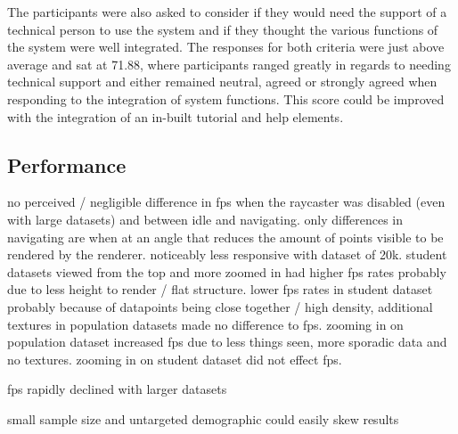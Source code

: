 {{		The participants were also asked to consider if they would need the support of a technical person to use the system and if they thought the various functions of the system were well integrated. The responses for both criteria were just above average and sat at 71.88, where participants ranged greatly in regards to needing technical support and either remained neutral, agreed or strongly agreed when responding to the integration of system functions. This score could be improved with the integration of an in-built tutorial and help elements.

	}

	\subsection{Performance} {
	\label{sec:performance}

		

		

		no perceived / negligible difference in fps when the raycaster was disabled (even with large datasets) and between idle and navigating. only differences in navigating are when at an angle that reduces the amount of points visible to be rendered by the renderer. noticeably less responsive with dataset of 20k. student datasets viewed from the top and more zoomed in had higher fps rates probably due to less height to render / flat structure. lower fps rates in student dataset probably because of datapoints being close together / high density, additional textures in population datasets made no difference to fps. zooming in on population dataset increased fps due to less things seen, more sporadic data and no textures. zooming in on student dataset did not effect fps.

		fps rapidly declined with larger datasets

		

	}

}

small sample size and untargeted demographic could easily skew results
